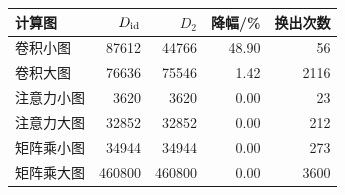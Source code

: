 \begin{tabular}{lrrrr}\toprule
计算图 & $D_{\rm id}$ & $D_2$ & 降幅/\% & 换出次数\\\midrule
卷积小图 & 87612 & 44766 & 48.90 & 56\\
卷积大图 & 76636 & 75546 & 1.42 & 2116\\
注意力小图 & 3620 & 3620 & 0.00 & 23\\
注意力大图 & 32852 & 32852 & 0.00 & 212\\
矩阵乘小图 & 34944 & 34944 & 0.00 & 273\\
矩阵乘大图 & 460800 & 460800 & 0.00 & 3600\\
\bottomrule\end{tabular}
